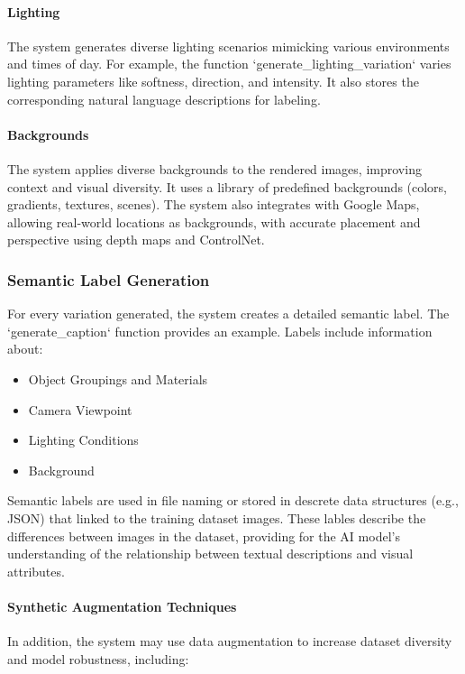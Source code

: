 \documentclass[12pt]{article}
\begin{document}
\paragraph{Lighting}
The system generates diverse lighting scenarios mimicking various environments and times of day. For example, the function `generate\_lighting\_variation` varies lighting parameters like softness, direction, and intensity. It also stores the corresponding natural language descriptions for labeling.

\paragraph{Backgrounds}
The system applies diverse backgrounds to the rendered images, improving context and visual diversity. It uses a library of predefined backgrounds (colors, gradients, textures, scenes). The system also integrates with Google Maps, allowing real-world locations as backgrounds, with accurate placement and perspective using depth maps and ControlNet.



\subsubsection{Semantic Label Generation}
For every variation generated, the system creates a detailed semantic label. The `generate\_caption` function provides an example. Labels include information about:

\begin{itemize}
    \item Object Groupings and Materials
    \item Camera Viewpoint
    \item Lighting Conditions
    \item Background
\end{itemize}

Semantic labels are used in file naming or stored in descrete data structures (e.g., JSON) that linked to the training dataset images. These lables describe the differences between images in the dataset, providing for the AI model's understanding of the relationship between textual descriptions and visual attributes.

\paragraph{Synthetic Augmentation Techniques}

In addition, the system may use data augmentation to increase dataset diversity and model robustness, including:
\end{document}
